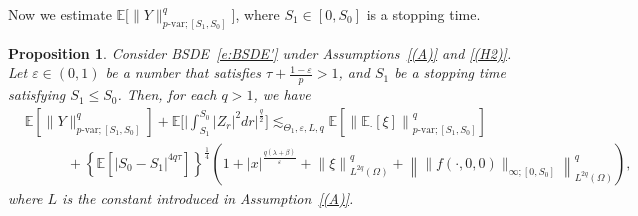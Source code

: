\documentclass[11pt,reqno]{amsart}
\newtheorem{proposition}{Proposition}[section]
\numberwithin{equation}{section}
\begin{document}
Now we estimate $ \mathbb{E}\big[\|Y\|^{q}_{p\text{-var};[S_{1},S_{0}]}\big]$, where $S_1\in[0,S_0]$ is a stopping time.

\begin{proposition}\label{prop:L^k estimate on stopping intervals}
Consider BSDE~\eqref{e:BSDE'} under Assumptions~\ref{(A)} and \ref{(H2)}. Let $\varepsilon\in(0,1)$ be a number that satisfies $\tau + \frac{1-\varepsilon}{p}>1$, and $S_1$ be a stopping time satisfying $S_1\le S_0$. Then, for each $q>1$, we have 
\begin{equation}\label{e:ineq-y-p-var}
\begin{aligned}
&\mathbb{E}\left[\|Y\|^{q}_{p\text{-}\mathrm{var};[S_{1},S_{0}]}\right] + \mathbb{E}\bigg[\Big|\int_{S_{1}}^{S_{0}}|Z_{r}|^{2}dr\Big|^{\frac{q}{2}}\bigg]\lesssim_{\Theta_{1},\varepsilon,L,q} \mathbb{E}\left[\left\|\mathbb{E}_{\cdot}\left[\xi\right]\right\|^{q}_{p\text{-}\mathrm{var};[S_1,S_0]}\right]\\
&\qquad\quad  + \left\{\mathbb{E}\left[|S_{0} - S_{1}|^{4q\tau}\right]\right\}^{\frac{1}{4}} \left(1 + |x|^{\frac{q(\lambda+\beta)}{\varepsilon}} + \left\|\xi\right\|^{q}_{L^{2q}(\Omega)} + \left\|\|f(\cdot,0,0)\|_{\infty;[0,S_{0}]}\right\|^{q}_{L^{2q}(\Omega)}\right) ,
\end{aligned}
\end{equation}
where $L$ is the constant introduced in Assumption~\ref{(A)}. 

\end{proposition}
\end{document}
